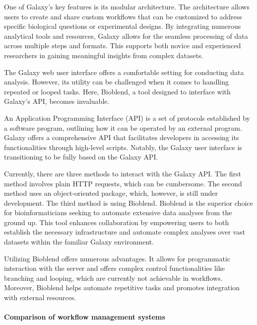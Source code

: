                 One of Galaxy's key features is its modular architecture. The architecture allows users to create and share custom workflows that can be customized to address specific biological questions or experimental designs. By integrating numerous analytical tools and resources, Galaxy allows for the seamless processing of data across multiple steps and formats. This supports both novice and experienced researchers in gaining meaningful insights from complex datasets.
        
                The Galaxy web user interface offers a comfortable setting for conducting data analysis. However, its utility can be challenged when it comes to handling repeated or looped tasks. Here, Bioblend, a tool designed to interface with Galaxy's API, becomes invaluable\cite{sloggett2013bioblend}.
        
                An Application Programming Interface (API) is a set of protocols established by a software program, outlining how it can be operated by an external program. Galaxy offers a comprehensive API that facilitates developers in accessing its functionalities through high-level scripts. Notably, the Galaxy user interface is transitioning to be fully based on the Galaxy API.
                
                Currently, there are three methods to interact with the Galaxy API. The first method involves plain HTTP requests, which can be cumbersome. The second method uses an object-oriented package, which, however, is still under development. The third method is using Bioblend. Bioblend is the superior choice for bioinformaticians seeking to automate extensive data analyses from the ground up. This tool enhances collaboration by empowering users to both establish the necessary infrastructure and automate complex analyses over vast datasets within the familiar Galaxy environment.
                
                Utilizing Bioblend offers numerous advantages. It allows for programmatic interaction with the server and offers complex control functionalities like branching and looping, which are currently not achievable in workflows. Moreover, Bioblend helps automate repetitive tasks and promotes integration with external resources.


            \paragraph*{Comparison of workflow management systems}

